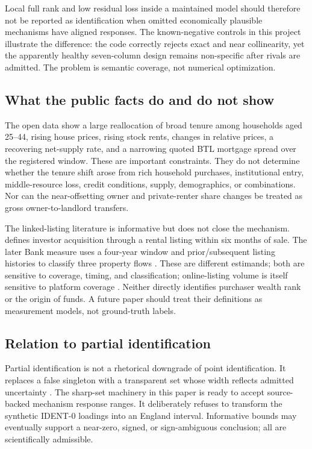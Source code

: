\documentclass[11pt]{article}
\begin{document}
Local full rank and low residual loss inside a maintained model should therefore
not be reported as identification when omitted economically plausible mechanisms
have aligned responses. The known-negative controls in this project illustrate
the difference: the code correctly rejects exact and near collinearity, yet the
apparently healthy seven-column design remains non-specific after rivals are
admitted. The problem is semantic coverage, not numerical optimization.

\subsection{What the public facts do and do not show}

The open data show a large reallocation of broad tenure among households aged
25--44, rising house prices, rising stock rents, changes in relative prices, a
recovering net-supply rate, and a narrowing quoted BTL mortgage spread over the
registered window. These are important constraints. They do not determine
whether the tenure shift arose from rich household purchases, institutional entry,
middle-resource loss, credit conditions, supply, demographics, or combinations.
Nor can the near-offsetting owner and private-renter share changes be treated as
gross owner-to-landlord transfers.

The linked-listing literature is informative but does not close the mechanism.
\citet{bracke2021} defines investor acquisition through a rental listing within six
months of sale. The later Bank measure uses a four-year window and prior/subsequent
listing histories to classify three property flows
\citep{bankofengland2023flows}. These are different estimands; both are sensitive
to coverage, timing, and classification; online-listing volume is itself sensitive
to platform coverage \citep{livingston2021}. Neither directly identifies purchaser
wealth rank or the origin of funds. A future paper should treat their definitions
as measurement models, not ground-truth labels.

\subsection{Relation to partial identification}

Partial identification is not a rhetorical downgrade of point identification.
It replaces a false singleton with a transparent set whose width reflects admitted
uncertainty \citep{manski2003,tamer2010}. The sharp-set machinery in this paper is
ready to accept source-backed mechanism response ranges. It deliberately refuses
to transform the synthetic IDENT-0 loadings into an England interval. Informative
bounds may eventually support a near-zero, signed, or sign-ambiguous conclusion;
all are scientifically admissible.
\end{document}
